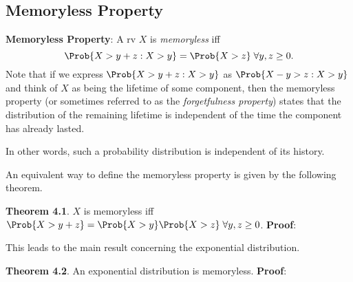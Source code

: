 \subsection*{Memoryless Property}
\begin{Regular}
    \textbf{Memoryless Property}: A rv $ X $ is \emph{memoryless} iff
    \[ \Prob{X>y+z\given X>y}=\Prob{X>z}\;\forall y,z\ge 0. \]
    Note that if we express $ \Prob{X>y+z\given X>y} $ as $ \Prob{X-y>z\given X>y} $ and think of $X$ as being
    the lifetime of some component, then the memoryless property (or sometimes referred to as
    the \emph{forgetfulness property}) states that the distribution of the remaining lifetime is independent
    of the time the component has already lasted.

    In other words, such a probability distribution is independent of its history.
\end{Regular}
An equivalent way to define the memoryless property is given by the following theorem.
\begin{Result}
    \textbf{Theorem 4.1}. $ X $ is memoryless iff $ \Prob{X>y+z}=\Prob{X>y}\Prob{X>z}\; \forall y,z\ge 0 $.
    \tcblower{}
    \textbf{Proof}:
\end{Result}
This leads to the main result concerning the exponential distribution.
\begin{Result}
    \textbf{Theorem 4.2}. An exponential distribution is memoryless.
    \tcblower{}
    \textbf{Proof}:
\end{Result}
